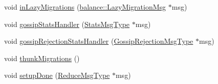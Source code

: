 \begin{DoxyCompactItemize}
void \hyperlink{structvt_1_1vrt_1_1collection_1_1lb_1_1_gossip_l_b_a2fa63a6d2dc211423423b0d7de1d1ed6}{in\+Lazy\+Migrations} (\hyperlink{structvt_1_1vrt_1_1collection_1_1balance_1_1_lazy_migration_msg}{balance\+::\+Lazy\+Migration\+Msg} $\ast$msg)
\item 
void \hyperlink{structvt_1_1vrt_1_1collection_1_1lb_1_1_gossip_l_b_a6cf29ed3fcc2d7db4c02cf0517cf8e49}{gossip\+Stats\+Handler} (\hyperlink{structvt_1_1vrt_1_1collection_1_1lb_1_1_base_l_b_a0cddaecd9e8450190585d0607a3439f1}{Stats\+Msg\+Type} $\ast$msg)
\item 
void \hyperlink{structvt_1_1vrt_1_1collection_1_1lb_1_1_gossip_l_b_ab4300cdb3ea4c7be65d127f2282a63ca}{gossip\+Rejection\+Stats\+Handler} (\hyperlink{structvt_1_1vrt_1_1collection_1_1lb_1_1_gossip_l_b_aca0c34945e33ca19b88af98ca8a6f062}{Gossip\+Rejection\+Msg\+Type} $\ast$msg)
\item 
void \hyperlink{structvt_1_1vrt_1_1collection_1_1lb_1_1_gossip_l_b_a7693c8b06ab78ef3565687621d810450}{thunk\+Migrations} ()
\item 
void \hyperlink{structvt_1_1vrt_1_1collection_1_1lb_1_1_gossip_l_b_a8ac1a82bee0f81996362076df16c2379}{setup\+Done} (\hyperlink{structvt_1_1vrt_1_1collection_1_1lb_1_1_gossip_l_b_ad251f887a319f433771b084187ef6089}{Reduce\+Msg\+Type} $\ast$msg)
\end{DoxyCompactItemize}

